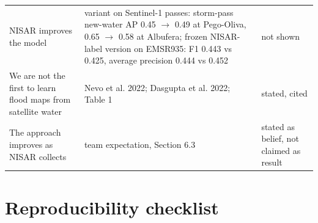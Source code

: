 \documentclass[10pt,twocolumn]{article}
\begin{document}
\begin{center}
\begin{tabularx}{\textwidth}{LLL}
{}NISAR improves the model & variant on Sentinel-1 passes: storm-pass new-water AP 0.45 $\rightarrow$ 0.49 at Pego-Oliva, 0.65 $\rightarrow$ 0.58 at Albufera; frozen NISAR-label version on EMSR935: F1 0.443 vs 0.425, average precision 0.444 vs 0.452 & not shown \\
{}We are not the first to learn flood maps from satellite water & Nevo et al. 2022; Dasgupta et al. 2022; Table 1 & stated, cited \\
{}The approach improves as NISAR collects & team expectation, Section 6.3 & stated as belief, not claimed as result \\
\bottomrule
\end{tabularx}
\end{center}

\section{Reproducibility checklist}
\end{document}
